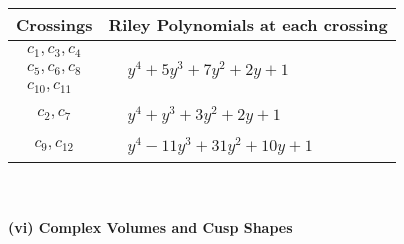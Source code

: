 \documentclass[1p]{elsarticle_modified}
\theoremstyle{definition}
\begin{document}
\begin{tabular}{m{50pt}|m{274pt}}
Crossings & \hspace{64pt}Riley Polynomials at each crossing \\
\hline $$\begin{aligned}c_{1},c_{3},c_{4}\\c_{5},c_{6},c_{8}\\c_{10},c_{11}\end{aligned}$$&$\begin{aligned}
&y^4+5 y^3+7 y^2+2 y+1
\end{aligned}$\\
\hline $$\begin{aligned}c_{2},c_{7}\end{aligned}$$&$\begin{aligned}
&y^4+y^3+3 y^2+2 y+1
\end{aligned}$\\
\hline $$\begin{aligned}c_{9},c_{12}\end{aligned}$$&$\begin{aligned}
&y^4-11 y^3+31 y^2+10 y+1
\end{aligned}$\\
\hline
\end{tabular}\\~\\
\newpage\flushleft \textbf{(vi) Complex Volumes and Cusp Shapes}
\end{document}

